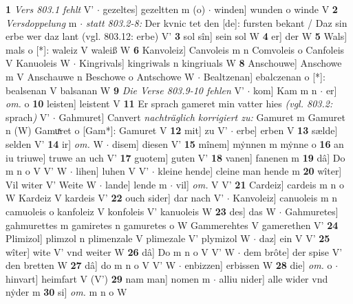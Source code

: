 \documentclass[8pt,a4paper,notitlepage]{article}
\begin{document}
\begin{table}[ht]
\begin{minipage}[t]{0.5\linewidth}
\textbf{1} \textit{Vers 803.1 fehlt} V'   $\cdot$ gezeltes] gezeltten m (o)  $\cdot$ winden] wunden o winde V \textbf{2} \textit{Versdoppelung} m   $\cdot$ \textit{statt 803.2-8:} Der kvnic tet den [de]: fursten bekant / Daz sin erbe wer daz lant (vgl. 803.12: erbe) V'  \textbf{3} sol sîn] sein sol W \textbf{4} er] der W \textbf{5} Wals] mals o [*]: waleiz V waleiß W \textbf{6} Kanvoleiz] Canvoleis m n Comvoleis o Canfoleis V Kanuoleis W  $\cdot$ Kingrivals] kingriwals n kingriuals W \textbf{8} Anschouwe] Anschowe m V Anschauwe n Beschowe o Antschowe W  $\cdot$ Bealtzenan] ebalczenan o [*]: bealsenan V balsanan W \textbf{9} \textit{Die Verse 803.9-10 fehlen} V'   $\cdot$ kom] Kam m n  $\cdot$ er] \textit{om.} o \textbf{10} leisten] leistent V \textbf{11} Er sprach gameret min vatter hies \textit{(vgl. 803.2:} sprach\textit{)} V'  $\cdot$ Gahmuret] Canvert \textit{nachträglich korrigiert zu:} Gamuret m Gamuret n (W) Gamuͯret o [Gam*]: Gamuret V \textbf{12} mit] zu V'  $\cdot$ erbe] erben V \textbf{13} sælde] selden V' \textbf{14} ir] \textit{om.} W  $\cdot$ disem] diesen V' \textbf{15} mînem] mẏnnen m mẏnne o \textbf{16} an iu triuwe] truwe an uch V' \textbf{17} guotem] guten V' \textbf{18} vanen] fanenen m \textbf{19} dâ] Do m n o V V' W  $\cdot$ lihen] luhen V V'  $\cdot$ kleine hende] cleine man hende m \textbf{20} wîter] Vil witer V' Weite W  $\cdot$ lande] lende m  $\cdot$ vil] \textit{om.} V V' \textbf{21} Cardeiz] cardeis m n o W Kardeiz V kardeis V' \textbf{22} ouch sider] dar nach V'  $\cdot$ Kanvoleiz] canuoleis m n camuoleis o kanfoleiz V konfoleis V' kanuoleis W \textbf{23} des] das W  $\cdot$ Gahmuretes] gahmurettes m gamiretes n gamuretes o W Gammerehtes V gamerethen V' \textbf{24} Plimizol] plimzol n plimenzale V plimezale V' plymizol W  $\cdot$ daz] ein V V' \textbf{25} wîter] wite V' vnd weiter W \textbf{26} dâ] Do m n o V V' W  $\cdot$ dem brôte] der spise V' den bretten W \textbf{27} dâ] do m n o V V' W  $\cdot$ enbizzen] erbissen W \textbf{28} die] \textit{om.} o  $\cdot$ hinvart] heimfart V (V') \textbf{29} nam man] nomen m  $\cdot$ alliu nider] alle wider vnd nẏder m \textbf{30} si] \textit{om.} m n o W \newline
\end{minipage}
\end{table}
\newpage
\end{document}
